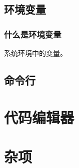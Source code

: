 \documentclass[10pt]{beamer}
\begin{document}
	
	\subsection{环境变量}
	\begin{frame}
		\frametitle{什么是环境变量}
		系统环境中的变量。
	\end{frame}
	
	\subsection{命令行}
	
	\section{代码编辑器}
	
	\section{杂项}
	
\end{document}

